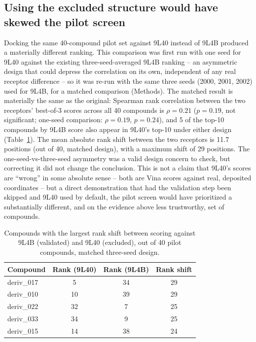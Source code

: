\documentclass[11pt]{article}
\begin{document}
\subsection*{Using the excluded structure would have skewed the pilot
screen}

Docking the same 40-compound pilot set against 9L40 instead of 9L4B
produced a materially different ranking. This comparison was first run
with one seed for 9L40 against the existing three-seed-averaged 9L4B
ranking -- an asymmetric design that could depress the correlation on its
own, independent of any real receptor difference -- so it was re-run with
the same three seeds (2000, 2001, 2002) used for 9L4B, for a matched
comparison (Methods). The matched result is materially the same as the
original: Spearman rank correlation between the two receptors' best-of-3
scores across all 40 compounds is $\rho=0.21$ ($p=0.19$, not
significant; one-seed comparison: $\rho=0.19$, $p=0.24$), and 5 of the
top-10 compounds by 9L4B score also appear in 9L40's top-10 under either
design (Table~\ref{tab:errorprop}). The mean absolute rank shift between
the two receptors is 11.7 positions (out of 40, matched design), with a
maximum shift of 29 positions. The one-seed-vs-three-seed asymmetry was a
valid design concern to check, but correcting it did not change the
conclusion. This is not a claim that 9L40's scores are ``wrong'' in some
absolute sense -- both are Vina scores against real, deposited
coordinates -- but a direct demonstration that had the validation step
been skipped and 9L40 used by default, the pilot screen would have
prioritized a substantially different, and on the evidence above less
trustworthy, set of compounds.

\begin{table}[htbp]
\centering
\caption{Compounds with the largest rank shift between scoring against 9L4B (validated) and 9L40 (excluded), out of 40 pilot compounds, matched three-seed design.}
\label{tab:errorprop}
\small
\begin{tabular}{lccc}
\toprule
Compound & Rank (9L40) & Rank (9L4B) & Rank shift \\
\midrule
deriv\_017 & 5  & 34 & 29 \\
deriv\_010 & 10 & 39 & 29 \\
deriv\_022 & 32 & 7  & 25 \\
deriv\_033 & 34 & 9  & 25 \\
deriv\_015 & 14 & 38 & 24 \\
\bottomrule
\end{tabular}
\end{table}
\end{document}
